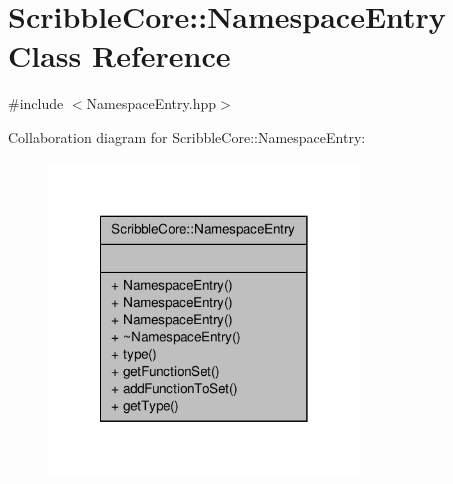 \hypertarget{class_scribble_core_1_1_namespace_entry}{\section{Scribble\-Core\-:\-:Namespace\-Entry Class Reference}
\label{class_scribble_core_1_1_namespace_entry}
}


{\ttfamily \#include $<$Namespace\-Entry.\-hpp$>$}



Collaboration diagram for Scribble\-Core\-:\-:Namespace\-Entry\-:
\nopagebreak
\begin{figure}[H]
\begin{center}
\leavevmode
\includegraphics[width=234pt]{class_scribble_core_1_1_namespace_entry__coll__graph}
\end{center}
\end{figure}
